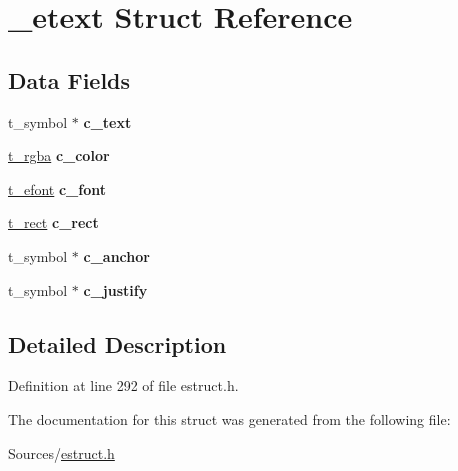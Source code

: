 \hypertarget{struct__etext}{\section{\-\_\-etext Struct Reference}
\label{struct__etext}
}
\subsection*{Data Fields}
\begin{DoxyCompactItemize}
\item 
\hypertarget{struct__etext_ac054c96b035a5f1a859bc8e46b636920}{t\-\_\-symbol $\ast$ {\bfseries c\-\_\-text}}\label{struct__etext_ac054c96b035a5f1a859bc8e46b636920}

\item 
\hypertarget{struct__etext_a8c9f65e6b5d93662d9b40a38b40a3a91}{\hyperlink{struct__rgba}{t\-\_\-rgba} {\bfseries c\-\_\-color}}\label{struct__etext_a8c9f65e6b5d93662d9b40a38b40a3a91}

\item 
\hypertarget{struct__etext_a5a04aa88bfa7e501cc22e79911ec6322}{\hyperlink{struct__efont}{t\-\_\-efont} {\bfseries c\-\_\-font}}\label{struct__etext_a5a04aa88bfa7e501cc22e79911ec6322}

\item 
\hypertarget{struct__etext_a3ad11827ad04fba1ba8cb1d853ad18dc}{\hyperlink{struct__rect}{t\-\_\-rect} {\bfseries c\-\_\-rect}}\label{struct__etext_a3ad11827ad04fba1ba8cb1d853ad18dc}

\item 
\hypertarget{struct__etext_aa5be622725b7ca85ad685a94104ab3fd}{t\-\_\-symbol $\ast$ {\bfseries c\-\_\-anchor}}\label{struct__etext_aa5be622725b7ca85ad685a94104ab3fd}

\item 
\hypertarget{struct__etext_a882eef71064831d5e3671b5a06cd0a1d}{t\-\_\-symbol $\ast$ {\bfseries c\-\_\-justify}}\label{struct__etext_a882eef71064831d5e3671b5a06cd0a1d}

\end{DoxyCompactItemize}


\subsection{Detailed Description}


Definition at line 292 of file estruct.\-h.



The documentation for this struct was generated from the following file\-:\begin{DoxyCompactItemize}
\item 
Sources/\hyperlink{estruct_8h}{estruct.\-h}\end{DoxyCompactItemize}
